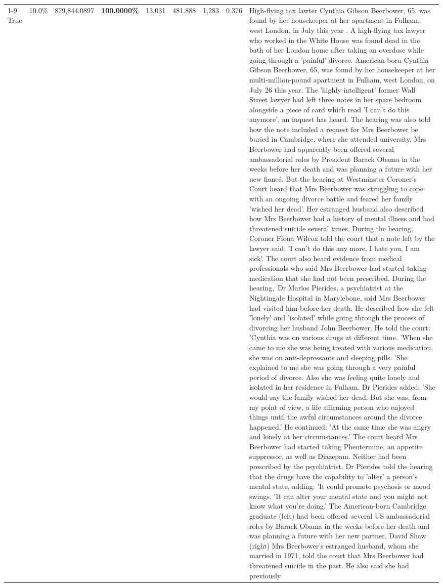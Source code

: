 \begin{table}[H]
\begin{tabular}{lllrlllll}
\cline{1-9}
True & 10.0\% & 879,844.0897 & \bfseries \color{red} 100.0000\% & 13.031 & 481.888 & 1,283 & 0.376 & High-flying tax lawter Cynthia Gibson Beerbower, 65, was found by her housekeeper at her apartment in Fulham, west London, in July this year . A high-flying tax lawyer who worked in the White House was found dead in the bath of her London home after taking an overdose while going through a 'painful' divorce. American-born Cynthia Gibson Beerbower, 65, was found by her housekeeper at her multi-million-pound apartment in Fulham, west London, on July 26 this year. The 'highly intelligent' former Wall Street lawyer had left three notes in her spare bedroom alongside a piece of card which read 'I can't do this anymore', an inquest has heard. The hearing was also told how the note included a request for Mrs Beerbower be buried in Cambridge, where she attended university. Mrs Beerbower had apparently been offered several ambassadorial roles by President Barack Obama in the weeks before her death and was planning a future with her new fiancé. But the hearing at Westminster Coroner's Court heard that Mrs Beerbower was struggling to cope with an ongoing divorce battle and feared her family 'wished her dead'. Her estranged husband also described how Mrs Beerbower had a history of mental illness and had threatened suicide several times. During the hearing, Coroner Fiona Wilcox told the court that a note left by the lawyer said: 'I can't do this any more, I hate you, I am sick'. The court also heard evidence from medical professionals who said Mrs Beerbower had started taking medication that she had not been prescribed. During the hearing, Dr Marios Pierides, a psychiatrist at the Nightingale Hospital in Marylebone, said Mrs Beerbower had visited him before her death. He described how she felt 'lonely' and 'isolated' while going through the process of divorcing her husband John Beerbower. He told the court: 'Cynthia was on various drugs at different time. 'When she came to me she was being treated with various medication, she was on anti-depressants and sleeping pills. 'She explained to me she was going through a very painful period of divorce. Also she was feeling quite lonely and isolated in her residence in Fulham. Dr Pierides added: 'She would say the family wished her dead. But she was, from my point of view, a life affirming person who enjoyed things until the awful circumstances around the divorce happened.' He continued: 'At the same time she was angry and lonely at her circumstances.' The court heard Mrs Beerbower had started taking Phentermine, an appetite suppressor, as well as Diazepam. Neither had been prescribed by the psychiatrist. Dr Pierides told the hearing that the drugs have the capability to 'alter' a person's mental state, adding: 'It could promote psychosis or mood swings. 'It can alter your mental state and you might not know what you're doing.' The American-born Cambridge graduate (left) had been offered several US ambassadorial roles by Barack Obama in the weeks before her death and was planning a future with her new partner, David Shaw (right) Mrs Beerbower's estranged husband, whom she married in 1971, told the court that Mrs Beerbower had threatened suicide in the past. He also said she had previously 
\end{tabular}
\end{table}
